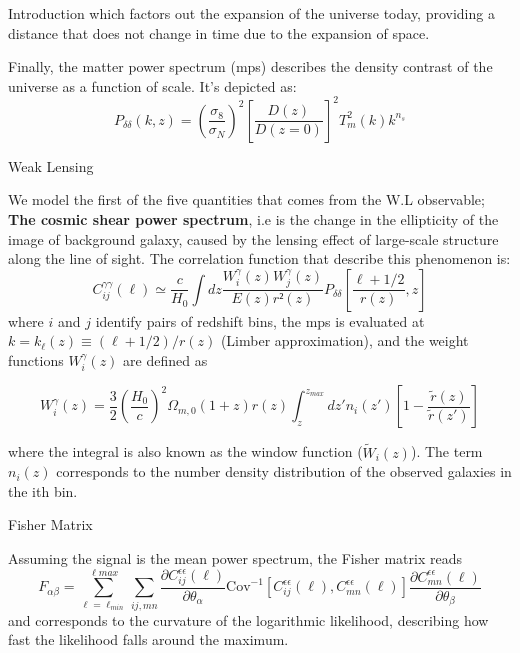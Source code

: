 \begin{frame}[t]
\begin{columns}[t]
\begin{column}{.465\textwidth}
\begin{block}{Introduction}
which factors out the expansion of the universe today, providing a distance that does not change in time due to the expansion of space.

Finally, the matter power spectrum (mps) describes the density contrast of the universe as a function of scale. It's depicted as: 
$$P_{\delta \delta}(k,z) = \left(\frac{\sigma _8}{\sigma _N}\right)^2\left[\frac{D(z)}{D(z=0)}\right]^2 T_m^2(k)k^{n_s}$$





\end{block}

\begin{block}{Weak Lensing}


We model the first of the five quantities that comes from the W.L observable; \textbf{The cosmic shear power spectrum}, i.e is the change in the ellipticity of the image of background galaxy, caused by the lensing effect of large-scale structure along the line of sight. The correlation function that describe this phenomenon is:
$$C_{ij}^{\gamma\gamma}(\ell)\simeq \frac{c}{H_0}\int dz\frac{W_i^\gamma(z)W_j^\gamma(z)}{E(z)r²(z)}P_{\delta\delta}\left[\frac{\ell + 1/2}{r(z)},z\right]$$ where $i$ and $j$ identify pairs of redshift bins, the mps is evaluated at $k=k_\ell(z)\equiv(\ell+1/2)/r(z)$ (Limber approximation), and the weight functions $W_i^\gamma(z)$ are defined as 


$$W_i^\gamma(z) = \frac{3}{2}\left(\frac{H_0}{c}\right)^2\Omega_{m,0}(1+z)r(z)
\int_z^{z_{max}}dz'n_i(z')\left[1-\frac{\tilde{r}(z)}{\tilde{r}(z')}\right]$$ 

where the integral is also known as the window function ($\tilde{W}_i(z)$). The term $n_i(z)$ corresponds to the number density distribution of the observed galaxies in the ith bin. %

    
\end{block}
\begin{block}{Fisher Matrix}

Assuming the signal is the mean power spectrum, the Fisher matrix reads
$$F_{\alpha\beta}=\sum_{\ell=\ell_{min}}^{\ell{max}}\sum_{ij,mn}\frac{\partial C_{ij}^{\epsilon\epsilon}(\ell)}{\partial \theta_\alpha}\text{Cov}^{-1}[C_{ij}^{\epsilon\epsilon}(\ell), C_{mn}^{\epsilon\epsilon}(\ell)]
\frac{\partial C_{mn}^{\epsilon\epsilon}(\ell)}{\partial \theta_\beta}$$ 
and corresponds to the curvature of the logarithmic likelihood, describing how fast the likelihood falls around the maximum.
\end{block}
\end{column}



\end{columns}
\end{frame}
